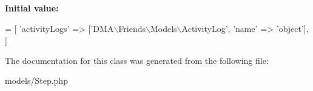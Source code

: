 {\bfseries Initial value\-:}
\begin{DoxyCode}
= [ 
        \textcolor{stringliteral}{'activityLogs'}  => [\textcolor{stringliteral}{'DMA\(\backslash\)Friends\(\backslash\)Models\(\backslash\)ActivityLog'}, \textcolor{stringliteral}{'name'} => \textcolor{stringliteral}{'object'}],
    ]
\end{DoxyCode}


The documentation for this class was generated from the following file\-:\begin{DoxyCompactItemize}
\item 
models/Step.\-php\end{DoxyCompactItemize}

